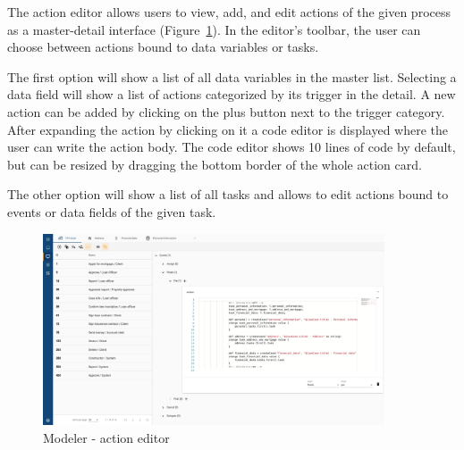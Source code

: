 The action editor allows users to view, add, and edit actions of the given process as a master-detail interface (Figure~\ref{fig:modeler_action_editor}).
In the editor's toolbar, the user can choose between actions bound to data variables or tasks.

The first option will show a list of all data variables in the master list.
Selecting a data field will show a list of actions categorized by its trigger in the detail.
A new action can be added by clicking on the plus button next to the trigger category.
After expanding the action by clicking on it a code editor is displayed where the user can write the action body.
The code editor shows 10 lines of code by default, but can be resized by dragging the bottom border of the whole action card.

The other option will show a list of all tasks and allows to edit actions bound to events or data fields of the given task.

\begin{figure}[h!]
  \centering
  \includegraphics[width=0.9\textwidth]{images/modeler_action_editor.png}
  \caption{Modeler - action editor}
  \label{fig:modeler_action_editor}
\end{figure}
